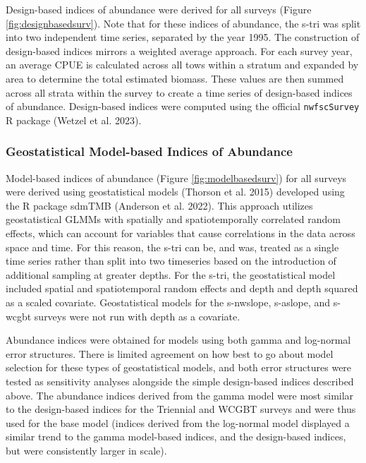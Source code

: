 \documentclass[11pt,
  english,
  letterpaper,
]{article}
\begin{document}
Design-based indices of abundance were derived for all surveys (Figure \ref{fig:designbasedsurv}). Note that for these indices of abundance, the \gls{s-tri} was split into two independent time series, separated by the year 1995. The construction of design-based indices mirrors a weighted average approach. For each survey year, an average CPUE is calculated across all tows within a stratum and expanded by area to determine the total estimated biomass. These values are then summed across all strata within the survey to create a time series of design-based indices of abundance. Design-based indices were computed using the official \texttt{nwfscSurvey} R package (Wetzel et al. 2023).

\hypertarget{geostatistical-model-based-indices-of-abundance}{%
\subsubsection{Geostatistical Model-based Indices of Abundance}\label{geostatistical-model-based-indices-of-abundance}}

Model-based indices of abundance (Figure \ref{fig:modelbasedsurv}) for all surveys were derived using geostatistical models (Thorson et al. 2015) developed using the R package sdmTMB (Anderson et al. 2022). This approach utilizes geostatistical GLMMs with spatially and spatiotemporally correlated random effects, which can account for variables that cause correlations in the data across space and time. For this reason, the \gls{s-tri} can be, and was, treated as a single time series rather than split into two timeseries based on the introduction of additional sampling at greater depths. For the \gls{s-tri}, the geostatistical model included spatial and spatiotemporal random effects and depth and depth squared as a scaled covariate. Geostatistical models for the \gls{s-nwslope}, \gls{s-aslope}, and \gls{s-wcgbt} surveys were not run with depth as a covariate.

Abundance indices were obtained for models using both gamma and log-normal error structures. There is limited agreement on how best to go about model selection for these types of geostatistical models, and both error structures were tested as sensitivity analyses alongside the simple design-based indices described above. The abundance indices derived from the gamma model were most similar to the design-based indices for the Triennial and WCGBT surveys and were thus used for the base model (indices derived from the log-normal model displayed a similar trend to the gamma model-based indices, and the design-based indices, but were consistently larger in scale).
\end{document}
